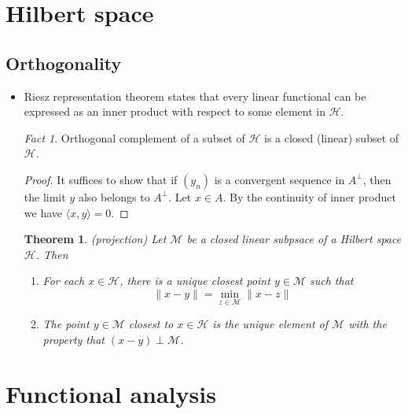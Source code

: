 \documentclass[11pt,reqno]{amsart}
\newtheorem{theorem}{Theorem}
\theoremstyle{remark}
\newtheorem{fact}{Fact}
\begin{document}
\section{Hilbert space}
\subsection{Orthogonality}
\begin{itemize}
\item Riesz representation theorem states that every linear functional can be expressed as an inner product with respect to some element in $\mathcal{H}$.
\begin{fact}
Orthogonal complement of a subset of $\mathcal{H}$ is a closed (linear) subset of $\mathcal{H}$.
\end{fact}
\begin{proof}
It suffices to show that if $(y_n)$ is a convergent sequence in $A^\perp$, then the limit $y$ also belongs to $A^\perp$.
 Let $x\in A$. By the continuity of inner product we have $\langle x,y\rangle=0$.
\end{proof}

\begin{theorem} (projection)
Let $\mathcal{M}$ be a closed linear subpsace of a Hilbert space $\mathcal{H}$. Then
\begin{enumerate}
\item For each $x\in \mathcal{H}$, there is a unique closest point $y\in\mathcal{M}$ such that 
\begin{equation}
\lVert x-y\rVert = \min_{z\in\mathcal{M}}\lVert x-z\rVert
\end{equation}
\item The point $y\in\mathcal{M}$ closest to $x\in\mathcal{H}$ is the unique element of $\mathcal{M}$ with the
 property that $(x-y)\perp\mathcal{M}$.
\end{enumerate}
\end{theorem}
\end{itemize}

\section{Functional analysis}
\end{document}
